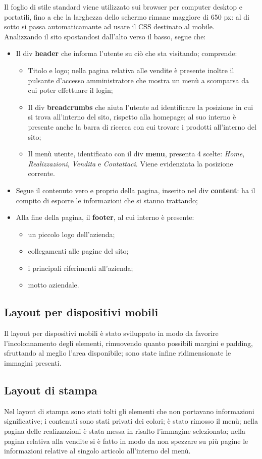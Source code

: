 {{		Il foglio di stile standard viene utilizzato sui browser per computer desktop e portatili, fino a che la larghezza dello schermo rimane maggiore di 650 px: al di sotto si passa automaticamante ad usare il CSS destinato al mobile.
		\\
		Analizzando il sito spostandosi dall'alto verso il basso, segue che:
		\begin{itemize}\itemsep1pt
			\item Il div \textbf{header} che informa l'utente su ciò che sta visitando; comprende:
			\begin{itemize}\itemsep1pt
				\item Titolo e logo; nella pagina relativa alle vendite è presente inoltre il pulsante d'accesso amministratore che mostra un menù a scomparsa da cui poter effettuare il login;
				\item Il div \textbf{breadcrumbs} che aiuta l'utente ad identificare la posizione in cui si trova all'interno del sito, rispetto alla homepage; al suo interno è presente anche la barra di ricerca con cui trovare i prodotti all'interno del sito;
				\item Il menù utente, identificato con il div \textbf{menu}, presenta 4 scelte: \textit{Home}, \textit{Realizzazioni}, \textit{Vendita} e \textit{Contattaci}. Viene evidenziata la posizione corrente. 
			\end{itemize}
			\item Segue il contenuto vero e proprio della pagina, inserito nel div \textbf{content}: ha il compito di esporre le informazioni che si stanno trattando;
			\item Alla fine della pagina, il \textbf{footer}, al cui interno è presente:
			\begin{itemize}\itemsep1pt
				\item un piccolo logo dell'azienda;
				\item collegamenti alle pagine del sito;
				\item i principali riferimenti all'azienda;
				\item motto aziendale.
			\end{itemize}
		\end{itemize}
		}
	\subsection{Layout per dispositivi mobili}{
		Il layout per dispositivi mobili è stato sviluppato in modo da favorire l'incolonnamento degli elementi, rimuovendo quanto possibili margini e padding, sfruttando al meglio l'area disponibile; sono state infine ridimensionate le immagini presenti.
	}
	\subsection{Layout di stampa}{
		Nel layout di stampa sono stati tolti gli elementi che non portavano informazioni significative; i contenuti sono stati privati dei colori; è stato rimosso il menù; nella pagina delle realizzazioni è stata messa in risalto l'immagine selezionata; nella pagina relativa alla vendite si è fatto in modo da non spezzare su più pagine le informazioni relative al singolo articolo all'interno del menù.
	}
}